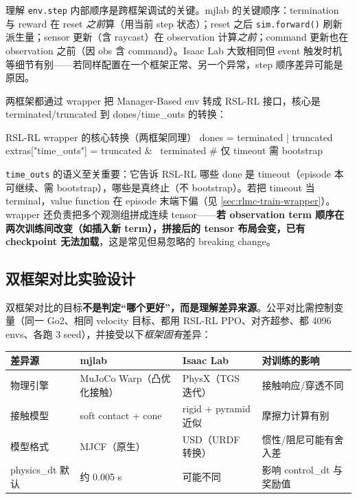 理解 \verb|env.step| 内部顺序是跨框架调试的关键。mjlab 的关键顺序：termination 与 reward 在 reset \emph{之前}算（用当前 step 状态）；reset 之后 \verb|sim.forward()| 刷新派生量；sensor 更新（含 raycast）在 observation 计算\emph{之前}；command 更新也在 observation 之前（因 obs 含 command）。Isaac Lab 大致相同但 event 触发时机等细节有别——若同样配置在一个框架正常、另一个异常，step 顺序差异可能是原因。

两框架都通过 wrapper 把 Manager-Based env 转成 RSL-RL 接口，核心是 terminated/truncated 到 dones/time\_outs 的转换：

\begin{codebox}[Python]{RSL-RL wrapper 的核心转换（两框架同理）}
dones = terminated | truncated
extras["time_outs"] = truncated & ~terminated   # 仅 timeout 需 bootstrap
\end{codebox}

\verb|time_outs| 的语义至关重要：它告诉 RSL-RL 哪些 done 是 timeout（episode 本可继续、需 bootstrap），哪些是真终止（不 bootstrap）。若把 timeout 当 terminal，value function 在 episode 末端下偏（见 \cref{sec:rlmc-train-wrapper}）。wrapper 还负责把多个观测组拼成连续 tensor——\textbf{若 observation term 顺序在两次训练间改变（如插入新 term），拼接后的 tensor 布局会变，已有 checkpoint 无法加载}，这是常见但易忽略的 breaking change。

\subsection{双框架对比实验设计}
\label{sec:rlmc-ql-dualframework-exp}

双框架对比的目标\textbf{不是判定“哪个更好”，而是理解差异来源}。公平对比需控制变量（同一 Go2、相同 velocity 目标、都用 RSL-RL PPO、对齐超参、都 4096 envs、各跑 3 seed），并接受以下\emph{框架固有}差异：

\begin{center}
\small
\begin{tabular}{@{}llll@{}}
\toprule
差异源 & mjlab & Isaac Lab & 对训练的影响 \\
\midrule
物理引擎 & MuJoCo Warp（凸优化接触） & PhysX（TGS 迭代） & 接触响应/穿透不同 \\
接触模型 & soft contact + cone & rigid + pyramid 近似 & 摩擦力计算有别 \\
模型格式 & MJCF（原生） & USD（URDF 转换） & 惯性/阻尼可能有舍入差 \\
physics\_dt 默认 & 约 0.005 s & 可能不同 & 影响 control\_dt 与奖励值 \\
\bottomrule
\end{tabular}
\end{center}

